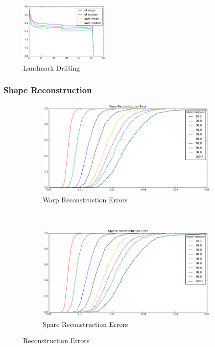 \begin{figure}[h!]
    \centering
    \includegraphics[width=0.4\textwidth]{resources/convergence_test}
    \caption{Landmark Drifting}
\end{figure}

\subsubsection{Shape Reconstruction}

\begin{figure}[h!]
    \centering
    \begin{subfigure}[b]{0.2\textwidth}
            \includegraphics[width=\textwidth]{resources/warp_reconstruction_error}
        \caption{Warp Reconstruction Errors}
        \label{}
    \end{subfigure}
    ~~
    \begin{subfigure}[b]{0.2\textwidth}
            \includegraphics[width=\textwidth]{resources/sparse_reconstruction_error}
        \caption{Spare Reconstruction Errors}
    \end{subfigure}
    \caption{Reconstruction Errors}
\end{figure}


